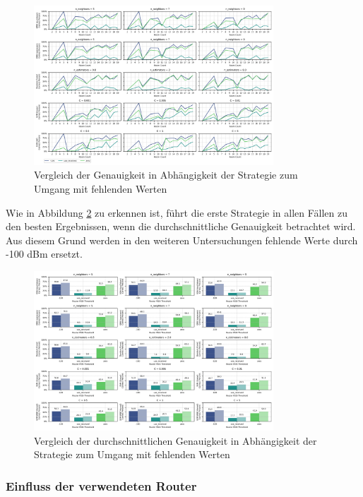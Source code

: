 \begin{figure}[H]
    \centering
    \includegraphics[width=0.8\textwidth]{images/06_handle_missing_values_strategy_02.png}
    \caption{Vergleich der Genauigkeit in Abhängigkeit der Strategie zum Umgang mit fehlenden Werten}
    \label{fig:06_handle_missing_values_strategy_02}
\end{figure}

Wie in Abbildung \ref{fig:06_handle_missing_values_strategy_03} zu erkennen ist, führt die erste Strategie in allen Fällen zu den besten Ergebnissen, wenn die durchschnittliche Genauigkeit betrachtet wird. Aus diesem Grund werden in den weiteren Untersuchungen fehlende Werte durch -100 dBm ersetzt.

\begin{figure}[H]
    \centering
    \includegraphics[width=0.8\textwidth]{images/06_handle_missing_values_strategy_03.png}
    \caption{Vergleich der durchschnittlichen Genauigkeit in Abhängigkeit der Strategie zum Umgang mit fehlenden Werten}
    \label{fig:06_handle_missing_values_strategy_03}
\end{figure}

\subsubsection{Einfluss der verwendeten Router}

